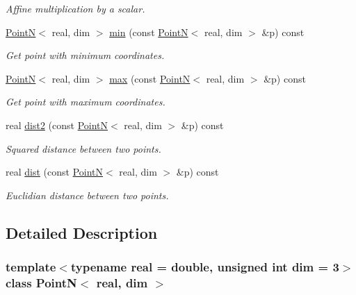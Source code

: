 \begin{DoxyCompactItemize}
\begin{DoxyCompactList}\small\item\em Affine multiplication by a scalar. \end{DoxyCompactList}\item 
\hyperlink{classPointN}{PointN}$<$ real, dim $>$ \hyperlink{classPointN_ad05e2c5bba8051980b02914ddaa6c491}{min} (const \hyperlink{classPointN}{PointN}$<$ real, dim $>$ \&p) const 
\begin{DoxyCompactList}\small\item\em Get point with minimum coordinates. \end{DoxyCompactList}\item 
\hyperlink{classPointN}{PointN}$<$ real, dim $>$ \hyperlink{classPointN_acde205e882ffba5dc3cd7000aa7d72b9}{max} (const \hyperlink{classPointN}{PointN}$<$ real, dim $>$ \&p) const 
\begin{DoxyCompactList}\small\item\em Get point with maximum coordinates. \end{DoxyCompactList}\item 
\hypertarget{classPointN_a245fdcfea715eb96303ad5f548881253}{
real \hyperlink{classPointN_a245fdcfea715eb96303ad5f548881253}{dist2} (const \hyperlink{classPointN}{PointN}$<$ real, dim $>$ \&p) const }
\label{classPointN_a245fdcfea715eb96303ad5f548881253}

\begin{DoxyCompactList}\small\item\em Squared distance between two points. \end{DoxyCompactList}\item 
\hypertarget{classPointN_ac82ba1c6569d98244a1128f47e8aa9b7}{
real \hyperlink{classPointN_ac82ba1c6569d98244a1128f47e8aa9b7}{dist} (const \hyperlink{classPointN}{PointN}$<$ real, dim $>$ \&p) const }
\label{classPointN_ac82ba1c6569d98244a1128f47e8aa9b7}

\begin{DoxyCompactList}\small\item\em Euclidian distance between two points. \end{DoxyCompactList}\end{DoxyCompactItemize}


\subsection{Detailed Description}
\subsubsection*{template$<$typename real = double, unsigned int dim = 3$>$class PointN$<$ real, dim $>$}

